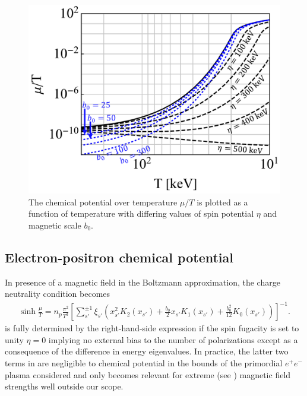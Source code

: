 \begin{figure}[ht]
 \centering
 \includegraphics[clip, trim=0.0cm 0.0cm 0.0cm 0.0cm,width=0.95\linewidth]{plots/chap04cosmo/thesis_chempot.pdf}
 \caption{The chemical potential over temperature $\mu/T$ is plotted as a function of temperature with differing values of spin potential $\eta$ and magnetic scale $b_{0}$.}
 \label{fig:chemicalpotential}
\end{figure}

\subsection{Electron-positron chemical potential}
\label{sec:chem}
\noindent In presence of a magnetic field in the Boltzmann approximation, the charge neutrality condition  becomes
\begin{gather}
 \label{chem}
 \sinh\frac{\mu}{T}=n_{p}\frac{\pi^{2}}{T^{3}}
 \left[\sum_{s'}^{\pm1}\xi_{s'}\!\left(\!x_{s'}^{2}K_{2}(x_{s'})\!+\!\frac{b_{0}}{2}x_{s'}K_{1}(x_{s'})\!+\!\frac{b_{0}^{2}}{12}K_{0}(x_{s'}\!)\!\right)\!\right]^{-1}\!.
\end{gather}
 is fully determined by the right-hand-side expression if the spin fugacity is set to unity $\eta=0$ implying no external bias to the number of polarizations except as a consequence of the difference in energy eigenvalues. In practice, the latter two terms in  are negligible to chemical potential in the bounds of the primordial $e^{+}e^{-}$ plasma considered and only becomes relevant for extreme (see ) magnetic field strengths well outside our scope.

